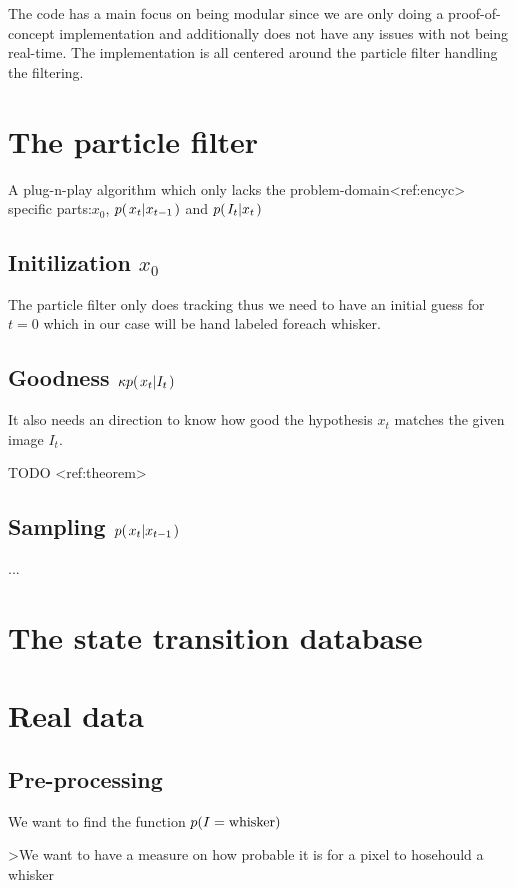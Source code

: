 
The code has a main focus on being modular since we are only doing a proof-of-concept implementation and additionally does not have any issues with not being real-time.
The implementation is all centered around the particle filter handling the filtering.

\section{The particle filter}
    A plug-n-play algorithm which only lacks the problem-domain<ref:encyc> specific parts:$x_0$, $p{(\left. x_t \middle\vert x_{t-1} \right.)}$ and $p{(\left. I_t \middle\vert x_t \right.)}$
    \subsection{Initilization $x_0$}
        The particle filter only does tracking thus we need to have an initial guess for $t=0$ which in our case will be hand labeled foreach whisker.
    \subsection{Goodness $\kappa p{(\left. x_t \middle\vert I_t \right.)}$}
        It also needs an direction to know how good the hypothesis $x_t$ matches the given image $I_t$.

        TODO <ref:theorem>
    \subsection{Sampling $p{(\left. x_t \middle\vert x_{t-1} \right.)}$}

        ...

\section{The state transition database}





\section{Real data}
    \subsection{Pre-processing}

    We want to find the function $p{(I=\text{whisker})}$

    >We want to have a measure on how probable it is for a pixel to hosehould a whisker





